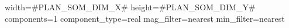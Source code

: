width=#PLAN_SOM_DIM_X#
height=#PLAN_SOM_DIM_Y#
components=1
component_type=real
mag_filter=nearest
min_filter=nearest
